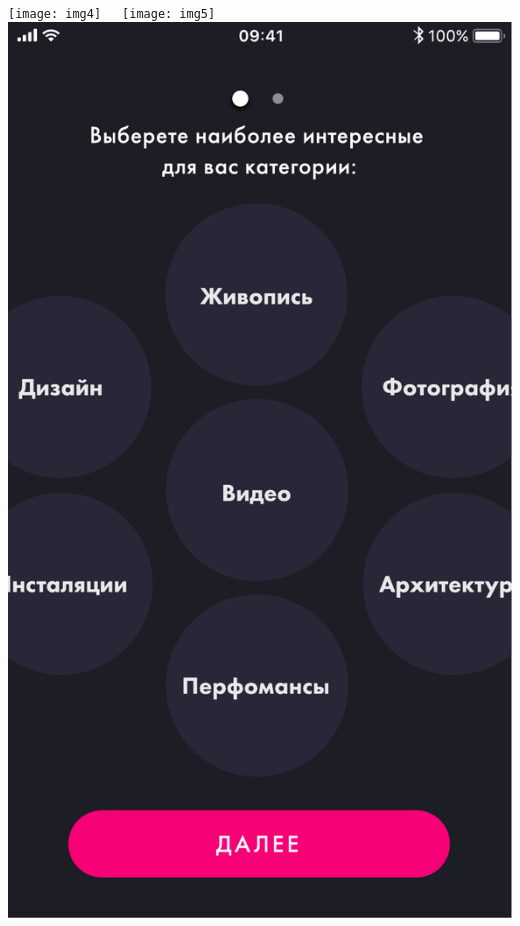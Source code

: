 \begin{center}
$\;$

\texttt{[image: img4]}
$\;$$\;$$\;$
\texttt{[image: img5]}
$\;$$\;$$\;$
\includegraphics[scale=0.4]{img6}

\end{center}
